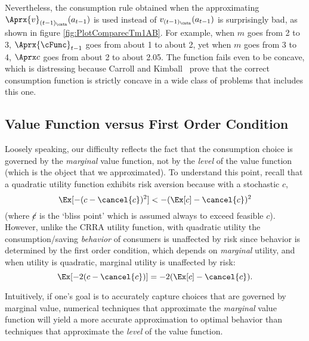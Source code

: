 
Nevertheless, the consumption rule obtained when the approximating $\Aprx{v}_{(t-1)_\cntn}(a_{t-1})$ is used instead of $v_{(t-1)_\cntn}(a_{t-1})$ is surprisingly bad, as shown in figure \ref{fig:PlotComparecTm1AB}.  For example, when $m$ goes from 2 to 3, $\Aprx{\cFunc}_{t-1}$ goes from about 1 to about 2, yet when $m$ goes from 3 to 4, $\Aprx c$ goes from about 2 to about 2.05.  The function fails even to be concave, which is distressing because Carroll and Kimball~\citeyearpar{ckConcavity} prove that the correct consumption function is strictly concave in a wide class of problems that includes this one.

\hypertarget{value-function-versus-first-order-condition}{}
\subsection{Value Function versus First Order Condition}\label{subsec:vVsuP}

Loosely speaking, our difficulty reflects the fact that the
consumption choice is governed by the \textit{marginal} value function,
not by the \textit{level} of the value function (which is the object that
we approximated).  To understand this point, recall that a quadratic
utility function
exhibits risk aversion because with a stochastic $c$,
\begin{equation}
  \Ex[-(c - \cancel{c})^{2}] < - (\Ex[c] - \cancel{c})^{2}
\end{equation}
(where $\cancel{c}$ is the `bliss point' which is assumed always to exceed feasible $c$). However, unlike the CRRA utility function,
with quadratic utility the consumption/saving \textit{behavior} of consumers
is unaffected by risk since behavior is determined by the first order condition, which
depends on \textit{marginal} utility, and when utility is quadratic, marginal utility is unaffected
by risk:
\begin{equation}
  \Ex[-2(c - \cancel{c})] = - 2(\Ex[c] - \cancel{c}).
\end{equation}

Intuitively, if one's goal is to accurately capture choices
that are governed by marginal value,
numerical techniques that approximate the \textit{marginal} value
function will yield a more accurate approximation to
optimal behavior than techniques that approximate the \textit{level}
of the value function.

